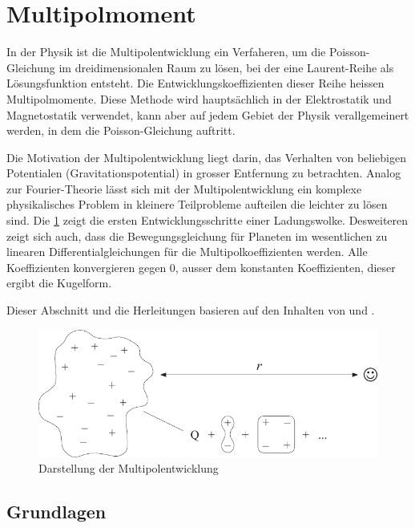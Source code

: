 %
%
%
%
\section{Multipolmoment
\label{planet:section:multipol}}
In der Physik ist die Multipolentwicklung ein Verfaheren, um die Poisson-Gleichung im dreidimensionalen Raum zu lösen, bei der eine Laurent-Reihe als Lösungsfunktion entsteht.
Die Entwicklungskoeffizienten dieser Reihe heissen Multipolmomente.
Diese Methode wird hauptsächlich in der Elektrostatik und Magnetostatik verwendet, kann aber auf jedem Gebiet der Physik verallgemeinert werden, in dem die Poisson-Gleichung auftritt.

Die Motivation der Multipolentwicklung liegt darin, das Verhalten von beliebigen Potentialen (Gravitationspotential) in grosser Entfernung zu betrachten.
Analog zur Fourier-Theorie lässt sich mit der Multipolentwicklung ein komplexe physikalisches Problem in kleinere Teilprobleme aufteilen die leichter zu lösen sind.
Die \cref{planet:fig:multipol} zeigt die ersten Entwicklungsschritte einer Ladungswolke.
Desweiteren zeigt sich auch, dass die Bewegungsgleichung für Planeten im wesentlichen zu linearen Differentialgleichungen für die Multipolkoeffizienten werden.
Alle Koeffizienten konvergieren gegen 0, ausser dem konstanten Koeffizienten, dieser ergibt die Kugelform.

Dieser Abschnitt und die Herleitungen basieren auf den Inhalten von \cite{planet:multi} und \cite{planet:quadro}.

\begin{figure}[h!]
    \centering
    \includegraphics[width=\linewidth]{papers/planet/pictures/Multipol.pdf}
    \caption{Darstellung der Multipolentwicklung
        \label{planet:fig:multipol}}
\end{figure}

\subsection{Grundlagen
\label{planet:subsection:grundlagen}}

